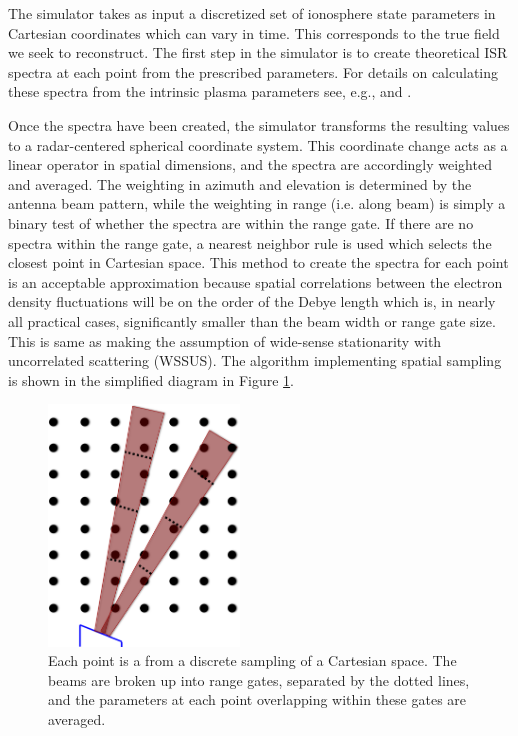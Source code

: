 The simulator takes as input a discretized set of ionosphere state parameters in Cartesian coordinates which can vary in time.  This corresponds to the true field we seek to reconstruct. The first step in the simulator is to create theoretical ISR spectra at each point from the prescribed parameters. For details on calculating these spectra from the intrinsic plasma parameters see, e.g., \cite{kudeki:milla:1} and \cite{kudeki:milla:2}. 

Once the spectra have been created, the simulator transforms the resulting values to a radar-centered spherical coordinate system. This coordinate change acts as a linear operator in spatial dimensions, and the spectra are accordingly weighted and averaged. The weighting in azimuth and elevation is determined by the antenna beam pattern, while the weighting in range (i.e. along beam) is simply a binary test of whether the spectra are within the range gate. If there are no spectra within the range gate, a nearest neighbor rule is used which selects the closest point in Cartesian space. This method to create the spectra for each point is an acceptable approximation because spatial correlations between the electron density fluctuations will be on the order of the Debye length \cite{farley1969} which is, in nearly all practical cases, significantly smaller than the beam width or range gate size. This is same as making the assumption of wide-sense stationarity with uncorrelated scattering (WSSUS)\cite{Kailath:1962jx}. The algorithm implementing spatial sampling is shown in the simplified diagram in Figure \ref{fig:beamdia}.

\begin{figure}[!t]
\centering
\includegraphics[width=2in]{beamsampling}
\caption{Each point is a from a discrete sampling of a Cartesian space. The beams are broken up into range gates, separated by the dotted lines, and the parameters at each point overlapping within these gates are averaged.}
\label{fig:beamdia}
\end{figure}
 
